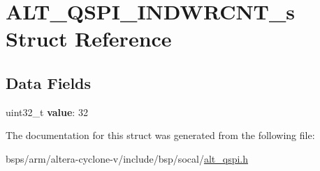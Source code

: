 \hypertarget{structALT__QSPI__INDWRCNT__s}{}\section{A\+L\+T\+\_\+\+Q\+S\+P\+I\+\_\+\+I\+N\+D\+W\+R\+C\+N\+T\+\_\+s Struct Reference}
\label{structALT__QSPI__INDWRCNT__s}
\subsection*{Data Fields}
\begin{DoxyCompactItemize}
\item 
\mbox{\label{structALT__QSPI__INDWRCNT__s_aa2bbc0022dfce141f9184b5290847fca}} 
uint32\+\_\+t {\bfseries value}\+: 32
\end{DoxyCompactItemize}


The documentation for this struct was generated from the following file\+:\begin{DoxyCompactItemize}
\item 
bsps/arm/altera-\/cyclone-\/v/include/bsp/socal/\mbox{\hyperlink{include_2bsp_2socal_2alt__qspi_8h}{alt\+\_\+qspi.\+h}}\end{DoxyCompactItemize}
